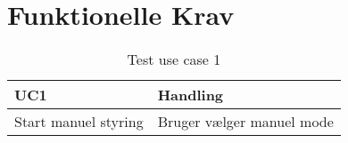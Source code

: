 
\section{Funktionelle Krav}

\begin{table}[htbp]
	\centering
	\begin{tabular}{|l|l|}
		\hline
		\textbf{UC1} 	& \textbf{Handling} \\\hline
		Start manuel styring	& Bruger vælger manuel mode \\\hline
		
		
	\end{tabular}
	\caption{Test use case 1}
	\label{tab:TestUC1}
	
\end{table}
